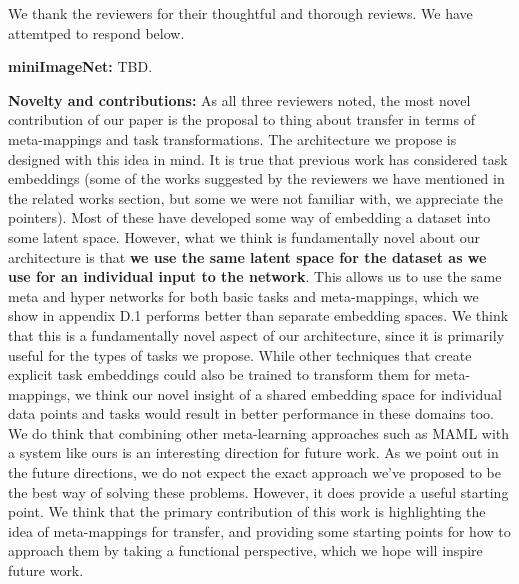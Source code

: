 \documentclass{article}
\begin{document}
We thank the reviewers for their thoughtful and thorough reviews. We have attemtped to respond below. \par
\textbf{miniImageNet:} TBD. \par
{}
\textbf{Novelty and contributions:} As all three reviewers noted, the most novel contribution of our paper is the proposal to thing about transfer in terms of meta-mappings and task transformations. The architecture we propose is designed with this idea in mind. It is true that previous work has considered task embeddings (some of the works suggested by the reviewers we have mentioned in the related works section, but some we were not familiar with, we appreciate the pointers). Most of these have developed some way of embedding a dataset into some latent space. However, what we think is fundamentally novel about our architecture is that \textbf{we use the same latent space for the dataset as we use for an individual input to the network}. This allows us to use the same meta and hyper networks for both basic tasks and meta-mappings, which we show in appendix D.1 performs better than separate embedding spaces. We think that this is a fundamentally novel aspect of our architecture, since it is primarily useful for the types of tasks we propose. While other techniques that create explicit task embeddings could also be trained to transform them for meta-mappings, we think our novel insight of a shared embedding space for individual data points and tasks would result in better performance in these domains too. We do think that combining other meta-learning approaches such as MAML with a system like ours is an interesting direction for future work. As we point out in the future directions, we do not expect the exact approach we've proposed to be the best way of solving these problems. However, it does provide a useful starting point. We think that the primary contribution of this work is highlighting the idea of meta-mappings for transfer, and providing some starting points for how to approach them by taking a functional perspective, which we hope will inspire future work. \par
{}
\end{document}
